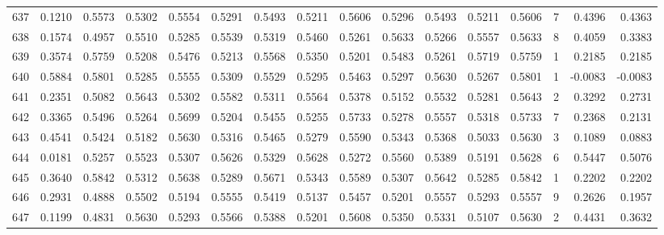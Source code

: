 \begin{tabular}{lrrrrrrrrrrrrrrr}
637 &      0.1210 &  0.5573 &  0.5302 &  0.5554 &  0.5291 &  0.5493 &  0.5211 &  0.5606 &  0.5296 &  0.5493 &   0.5211 &     0.5606 &      7 &                    0.4396 &                     0.4363 \\
638 &      0.1574 &  0.4957 &  0.5510 &  0.5285 &  0.5539 &  0.5319 &  0.5460 &  0.5261 &  0.5633 &  0.5266 &   0.5557 &     0.5633 &      8 &                    0.4059 &                     0.3383 \\
639 &      0.3574 &  0.5759 &  0.5208 &  0.5476 &  0.5213 &  0.5568 &  0.5350 &  0.5201 &  0.5483 &  0.5261 &   0.5719 &     0.5759 &      1 &                    0.2185 &                     0.2185 \\
640 &      0.5884 &  0.5801 &  0.5285 &  0.5555 &  0.5309 &  0.5529 &  0.5295 &  0.5463 &  0.5297 &  0.5630 &   0.5267 &     0.5801 &      1 &                   -0.0083 &                    -0.0083 \\
641 &      0.2351 &  0.5082 &  0.5643 &  0.5302 &  0.5582 &  0.5311 &  0.5564 &  0.5378 &  0.5152 &  0.5532 &   0.5281 &     0.5643 &      2 &                    0.3292 &                     0.2731 \\
642 &      0.3365 &  0.5496 &  0.5264 &  0.5699 &  0.5204 &  0.5455 &  0.5255 &  0.5733 &  0.5278 &  0.5557 &   0.5318 &     0.5733 &      7 &                    0.2368 &                     0.2131 \\
643 &      0.4541 &  0.5424 &  0.5182 &  0.5630 &  0.5316 &  0.5465 &  0.5279 &  0.5590 &  0.5343 &  0.5368 &   0.5033 &     0.5630 &      3 &                    0.1089 &                     0.0883 \\
644 &      0.0181 &  0.5257 &  0.5523 &  0.5307 &  0.5626 &  0.5329 &  0.5628 &  0.5272 &  0.5560 &  0.5389 &   0.5191 &     0.5628 &      6 &                    0.5447 &                     0.5076 \\
645 &      0.3640 &  0.5842 &  0.5312 &  0.5638 &  0.5289 &  0.5671 &  0.5343 &  0.5589 &  0.5307 &  0.5642 &   0.5285 &     0.5842 &      1 &                    0.2202 &                     0.2202 \\
646 &      0.2931 &  0.4888 &  0.5502 &  0.5194 &  0.5555 &  0.5419 &  0.5137 &  0.5457 &  0.5201 &  0.5557 &   0.5293 &     0.5557 &      9 &                    0.2626 &                     0.1957 \\
647 &      0.1199 &  0.4831 &  0.5630 &  0.5293 &  0.5566 &  0.5388 &  0.5201 &  0.5608 &  0.5350 &  0.5331 &   0.5107 &     0.5630 &      2 &                    0.4431 &                     0.3632 \\

\end{tabular}
